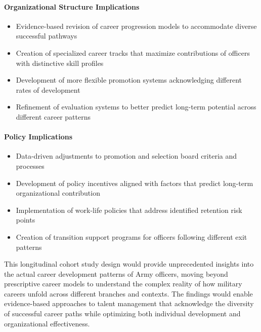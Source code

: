 \documentclass[../main.tex]{subfiles}
\begin{document}
\paragraph{Organizational Structure Implications}
\begin{itemize}
\item Evidence-based revision of career progression models to accommodate diverse successful pathways
\item Creation of specialized career tracks that maximize contributions of officers with distinctive skill profiles
\item Development of more flexible promotion systems acknowledging different rates of development
\item Refinement of evaluation systems to better predict long-term potential across different career patterns
\end{itemize}

\paragraph{Policy Implications}
\begin{itemize}
\item Data-driven adjustments to promotion and selection board criteria and processes
\item Development of policy incentives aligned with factors that predict long-term organizational contribution
\item Implementation of work-life policies that address identified retention risk points
\item Creation of transition support programs for officers following different exit patterns
\end{itemize}

This longitudinal cohort study design would provide unprecedented insights into the actual career development patterns of Army officers, moving beyond prescriptive career models to understand the complex reality of how military careers unfold across different branches and contexts. The findings would enable evidence-based approaches to talent management that acknowledge the diversity of successful career paths while optimizing both individual development and organizational effectiveness.

\end{document}
